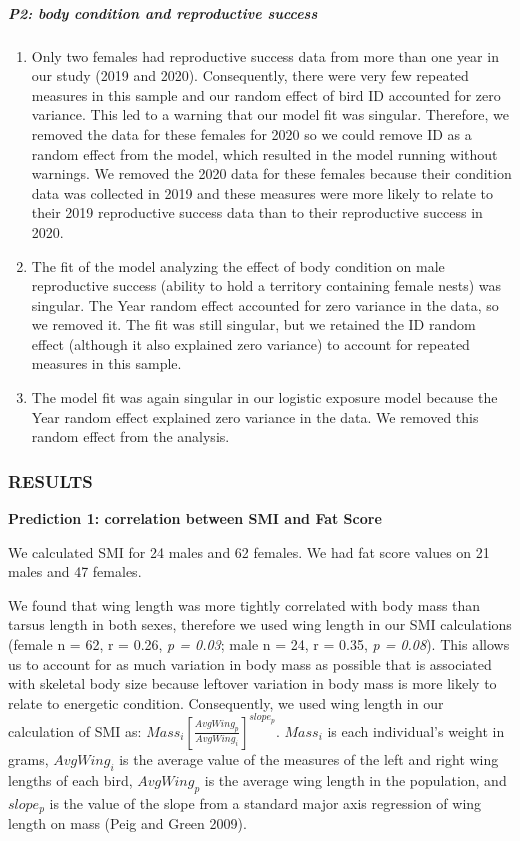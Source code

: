 \documentclass[
]{article}
\begin{document}
\hypertarget{p2-body-condition-and-reproductive-success}{%
\subparagraph{P2: body condition and reproductive
success}\label{p2-body-condition-and-reproductive-success}}

\begin{enumerate}
\def\labelenumi{\arabic{enumi})}
\setcounter{enumi}{5}
\item
  Only two females had reproductive success data from more than one year
  in our study (2019 and 2020). Consequently, there were very few
  repeated measures in this sample and our random effect of bird ID
  accounted for zero variance. This led to a warning that our model fit
  was singular. Therefore, we removed the data for these females for
  2020 so we could remove ID as a random effect from the model, which
  resulted in the model running without warnings. We removed the 2020
  data for these females because their condition data was collected in
  2019 and these measures were more likely to relate to their 2019
  reproductive success data than to their reproductive success in 2020.
\item
  The fit of the model analyzing the effect of body condition on male
  reproductive success (ability to hold a territory containing female
  nests) was singular. The Year random effect accounted for zero
  variance in the data, so we removed it. The fit was still singular,
  but we retained the ID random effect (although it also explained zero
  variance) to account for repeated measures in this sample.
\item
  The model fit was again singular in our logistic exposure model
  because the Year random effect explained zero variance in the data. We
  removed this random effect from the analysis.
\end{enumerate}

\hypertarget{results}{%
\subsubsection{RESULTS}\label{results}}

\textbf{Prediction 1: correlation between SMI and Fat Score}

We calculated SMI for 24 males and 62 females. We had fat score values
on 21 males and 47 females.

We found that wing length was more tightly correlated with body mass
than tarsus length in both sexes, therefore we used wing length in our
SMI calculations (female n = 62, r = 0.26, \emph{p = 0.03}; male n = 24,
r = 0.35, \emph{p = 0.08}). This allows us to account for as much
variation in body mass as possible that is associated with skeletal body
size because leftover variation in body mass is more likely to relate to
energetic condition. Consequently, we used wing length in our
calculation of SMI as:
\(Mass_i\left[ \frac{AvgWing_p}{AvgWing_i} \right]^{slope_p}\).
\(Mass_i\) is each individual's weight in grams, \(AvgWing_i\) is the
average value of the measures of the left and right wing lengths of each
bird, \(AvgWing_p\) is the average wing length in the population, and
\(slope_p\) is the value of the slope from a standard major axis
regression of wing length on mass (Peig and Green 2009).
\end{document}
